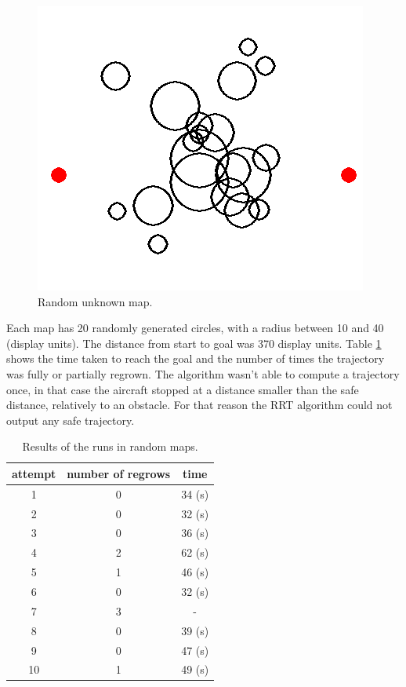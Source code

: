 \begin{figure}[H]
    \centering
    \includegraphics[width=0.6\linewidth]{Figures/07_simulation/lidar/lidarRandQ.png}
    \caption{Random unknown map.}
    \label{fig:dodQ}
\end{figure}


Each map has 20 randomly generated circles, with a radius between 10 and 40 (display units). The distance from start to goal was 370 display units. Table \ref{tab:randomResults} shows the time taken to reach the goal and the number of times the trajectory was fully or partially regrown. The algorithm wasn't able to compute a trajectory once, in that case the aircraft stopped at a distance smaller than the safe distance, relatively to an obstacle. For that reason the RRT algorithm could not output any safe trajectory.


\begin{table}[]
    \centering
    \begin{tabular}{c|cc}
        attempt & number of regrows & time \\ \hline
        1 & 0 &  34 (s) \\
        2 & 0 &  32 (s) \\
        3 & 0 &  36 (s) \\
        4 & 2 &  62 (s) \\
        5 & 1 &  46 (s) \\
        6 & 0 &  32 (s) \\
        7 & 3 &  -  \\
        8 & 0 &  39 (s) \\
        9 & 0 &  47 (s) \\
        10& 1 &  49 (s) \\ \hline
        
        
    \end{tabular}
    \caption{Results of the runs in random maps.}
    \label{tab:randomResults}
\end{table}{}

